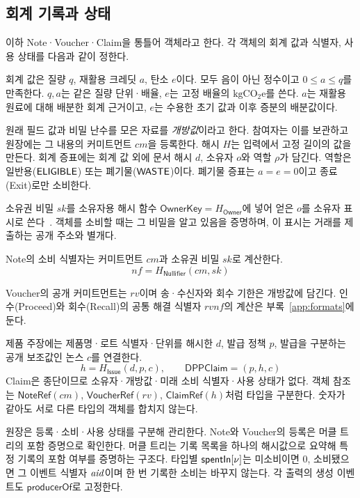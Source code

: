 \subsection{회계 기록과 상태}
\label{sec:objects}

이하 Note·Voucher·Claim을 통틀어 객체라고 한다.
각 객체의 회계 값과 식별자, 사용 상태를 다음과 같이 정한다.

회계 값은 질량 $q$, 재활용 크레딧 $a$, 탄소 $e$이다.
모두 음이 아닌 정수이고 $0\leq a\leq q$를 만족한다.
$q,a$는 같은 질량 단위·배율, $e$는 고정 배율의
$\mathrm{kgCO_2e}$를 쓴다. $a$는 재활용 원료에 대해 배분한 회계 근거이고,
$e$는 수용한 초기 값과 이후 증분의 배분값이다.

원래 필드 값과 비밀 난수를 모은 자료를 \emph{개방값}이라고 한다.
참여자는 이를 보관하고 원장에는 그 내용의 커미트먼트 $cm$을 등록한다.
해시 $H$는 입력에서 고정 길이의 값을 만든다.
회계 증표에는 회계 값 외에 문서 해시 $d$, 소유자 $o$와
역할 $\rho$가 담긴다. 역할은 일반용($\textsf{ELIGIBLE}$) 또는
폐기물($\textsf{WASTE}$)이다. 폐기물 증표는 $a=e=0$이고
종료(Exit)로만 소비한다.

소유권 비밀 $sk$를 소유자용 해시 함수
$\mathsf{OwnerKey}=H_{\mathsf{Owner}}$에 넣어 얻은 $o$를
소유자 표시로 쓴다~\cite{zkdpp-implementation-profile-2026}.
객체를 소비할 때는 그 비밀을 알고 있음을 증명하며,
이 표시는 거래를 제출하는 공개 주소와 별개다.

Note의 소비 식별자는 커미트먼트 $cm$과 소유권 비밀 $sk$로 계산한다.
\begin{equation}
 nf=H_{\mathsf{Nullifier}}(cm,sk)
 \label{eq:nf}
\end{equation}

Voucher의 공개 커미트먼트는 $rv$이며 송·수신자와 회수 기한은
개방값에 담긴다. 인수(Proceed)와 회수(Recall)의 공통 해결 식별자
$rvnf$의 계산은 부록~\ref{app:formats}에 둔다.

제품 주장에는 제품명·로트 식별자·단위를 해시한 $d$,
발급 정책 $p$, 발급을 구분하는 공개 보조값인 논스 $c$를 연결한다.
\begin{equation}
 h=H_{\mathsf{Issue}}(d,p,c),\qquad \mathsf{DPPClaim}=(p,h,c)
 \label{eq:claim}
\end{equation}
Claim은 종단이므로 소유자·개방값·미래 소비 식별자·사용 상태가 없다.
객체 참조는
$\mathsf{NoteRef}(cm)$, $\mathsf{VoucherRef}(rv)$,
$\mathsf{ClaimRef}(h)$처럼 타입을 구분한다.
숫자가 같아도 서로 다른 타입의 객체를 합치지 않는다.

원장은 등록·소비·사용 상태를 구분해 관리한다.
Note와 Voucher의 등록은 머클 트리의 포함 증명으로 확인한다.
머클 트리는 기록 목록을 하나의 해시값으로 요약해 특정 기록의
포함 여부를 증명하는 구조다.
타입별 $\mathsf{spentIn}[\nu]$는 미소비이면 0, 소비됐으면 그 이벤트
식별자 $\mathit{aid}$이며 한 번 기록한 소비는 바꾸지 않는다.
각 출력의 생성 이벤트도 $\mathsf{producerOf}$로 고정한다.


